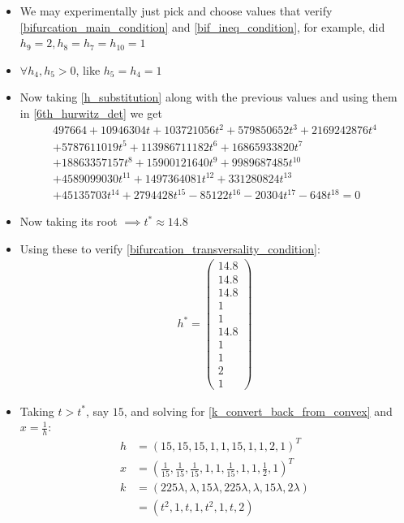 \begin{itemize}
	\item {} We may experimentally just pick and choose values that verify	\ref{bifurcation_main_condition} and \ref{bif_ineq_condition}, for example, \cite{conradi2024} did $ h_9 = 2, h_8 = h_7 = h_{ 10 } = 1$
	\item {} $\forall h_4, h_5 > 0$, like $h_5 = h_4 = 1$
	\item {} Now taking \ref{h_substitution} along with the previous values and using them in \ref{6th_hurwitz_det} we get
		\begin{gather*}
			497664+10946304t+103721056t^{2}+579850652t^{3}+2169242876t^{4} \\
			+5787611019t^{5}+113986711182t^{6}+16865933820t^{7} \\
			+18863357157t^{8}+15900121640t^{9}+9989687485t^{10} \\
			+4589099030t^{11}+1497364081t^{12}+331280824t^{13} \\
			+45135703t^{14}+2794428t^{15}-85122t^{16}-20304t^{17}-648t^{18}=0	
		\end{gather*}
	\item {} Now taking its root $\implies t^* \approx 14.8$
	\item {} Using these to verify \ref{bifurcation_transversality_condition}:
		\begin{align*}
			h^* =
			\begin{pmatrix}
				14.8 \\
				14.8 \\
				14.8 \\
				1 \\
				1 \\
				14.8 \\
				1 \\
				1 \\
				2 \\
				1
			\end{pmatrix}
		\end{align*}
	\item {} Taking $t > t^*$, say $15$, and solving for \ref{k_convert_back_from_convex} and $x = \frac{1}{h}$:
		\begin{align}
			h &= \left(15,15,15, 1,1,15,1,1,2,1\right)^T \\
			x &= \left( \frac{1}{15},\frac{1}{15},\frac{1}{15},1,1,\frac{1}{15},1,1,\frac{1}{2},1 \right)^T \\
			k &= \left( 225 \lambda, \lambda, 15\lambda, 225\lambda, \lambda, 15\lambda, 2\lambda  \right) \\
			&= (t^{2},1,t,1,t^{2},1,t,2)
		\end{align}
\end{itemize}
